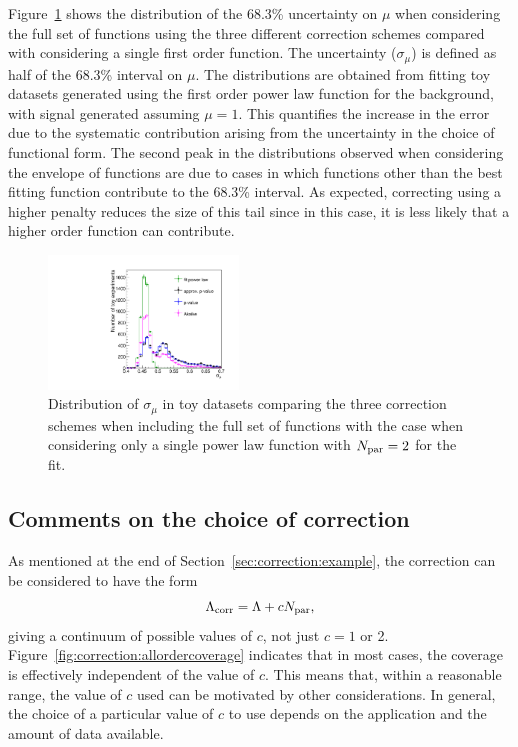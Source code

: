 Figure~\ref{fig:correction:compareerrors} shows the distribution of the 68.3\%
 uncertainty on $\mu$
when considering the full set of functions using the three different correction schemes compared
with considering a single first order function. The uncertainty ($\sigma_{\mu}$)
is defined as half of the 68.3\% interval on $\mu$.
The distributions are obtained from fitting
toy datasets generated using the first order power law function for the background, with
signal generated assuming $\mu=1$. This quantifies the increase in the error
due to the systematic contribution arising from the uncertainty in the choice of functional form.
The second peak in the distributions observed
when considering the envelope of functions are due to cases in which functions other than the
best fitting function contribute to the 68.3\% interval. As expected, correcting using a higher
penalty reduces the size of this tail since in this case, it is less likely that a higher order
function can contribute.

\begin{figure}[tbp]
\centering
\includegraphics[width=0.45\textwidth]{correction/compare_error_magnitude.pdf}
\caption{Distribution of $\sigma_{\mu}$ in toy datasets
comparing the three correction schemes
when including the full set of functions
with the case when considering only a single power law function
with $N_{\rm par}=2$ for the fit.}
\label{fig:correction:compareerrors}
\end{figure}

\subsection{Comments on the choice of correction}
\label{sec:correction:comments}
 As mentioned at the end of Section~\ref{sec:correction:example},
the correction can be considered to have the form
\begin{displaymath}
\Lambda_{\mathrm{corr}} = \textrm{\ensuremath{\Lambda}} + cN_{\rm par},
\end{displaymath}
giving a continuum of possible values of $c$, not just $c=1$ or 2.
Figure~\ref{fig:correction:allordercoverage} indicates that in most cases, the
coverage is effectively independent of the value of $c$. This means that,
within a reasonable range,
the value of $c$ used can be motivated by other considerations. In general,
the choice of a particular value of $c$ to use depends on the application
and the amount of data available.


